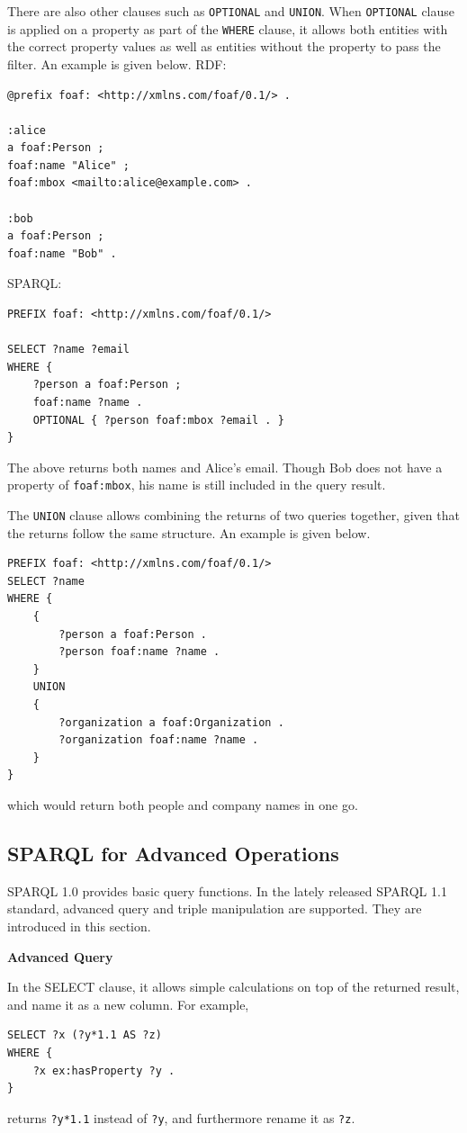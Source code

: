 There are also other clauses such as \verb|OPTIONAL| and \verb|UNION|. When \verb|OPTIONAL| clause is applied on a property as part of the \verb|WHERE| clause, it allows both entities with the correct property values as well as entities without the property to pass the filter. An example is given below. RDF:
\begin{lstlisting}
@prefix foaf: <http://xmlns.com/foaf/0.1/> .

:alice
a foaf:Person ;
foaf:name "Alice" ;
foaf:mbox <mailto:alice@example.com> .

:bob
a foaf:Person ;
foaf:name "Bob" .
\end{lstlisting}
SPARQL:
\begin{lstlisting}
PREFIX foaf: <http://xmlns.com/foaf/0.1/>

SELECT ?name ?email
WHERE {
	?person a foaf:Person ;
	foaf:name ?name .
	OPTIONAL { ?person foaf:mbox ?email . }
}
\end{lstlisting}
The above returns both names and Alice's email. Though Bob does not have a property of \verb|foaf:mbox|, his name is still included in the query result.

The \verb|UNION| clause allows combining the returns of two queries together, given that the returns follow the same structure. An example is given below.
\begin{lstlisting}
PREFIX foaf: <http://xmlns.com/foaf/0.1/>
SELECT ?name
WHERE {
	{
		?person a foaf:Person .
		?person foaf:name ?name .
	}
	UNION
	{
		?organization a foaf:Organization .
		?organization foaf:name ?name .
	}
}
\end{lstlisting}
which would return both people and company names in one go.

\subsection{SPARQL for Advanced Operations}

SPARQL 1.0 provides basic query functions. In the lately released SPARQL 1.1 standard, advanced query and triple manipulation are supported. They are introduced in this section.

\vspace{0.1in}
\noindent \textbf{Advanced Query}
\vspace{0.1in}

In the SELECT clause, it allows simple calculations on top of the returned result, and name it as a new column. For example,
\begin{lstlisting}
SELECT ?x (?y*1.1 AS ?z)
WHERE {
	?x ex:hasProperty ?y .
}
\end{lstlisting}
returns \verb|?y*1.1| instead of \verb|?y|, and furthermore rename it as \verb|?z|.


